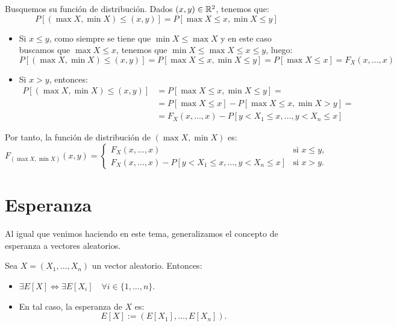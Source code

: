 Busquemos su función de distribución. Dados $(x,y)\in \mathbb{R}^2$, tenemos que:
\begin{equation*}
    P[(\max X, \min X)\leq (x,y)] = P[\max X\leq x, \min X\leq y]
\end{equation*}
\begin{itemize}
    \item Si $x\leq y$, como siempre se tiene que $\min X\leq \max X$ y en este caso buscamos que $\max X\leq x$, tenemos que $\min X\leq \max X\leq x\leq y$, luego:
    \begin{equation*}
        P[(\max X, \min X)\leq (x,y)] = P[\max X\leq x, \min X\leq y] = P[\max X\leq x] = F_X(x,\dots,x)
    \end{equation*}

    \item Si $x>y$, entonces:
    \begin{align*}
        P[(\max X, \min X)\leq (x,y)] &= P[\max X\leq x, \min X\leq y] =\\&= P[\max X\leq x] - P[\max X\leq x,\min X> y] =\\&= F_X(x,\dots,x) - P[y<X_1\leq x,\dots,y<X_n\leq x]
    \end{align*}
\end{itemize}

Por tanto, la función de distribución de $(\max X, \min X)$ es:
\begin{equation*}
    F_{(\max X, \min X)}(x,y) = \begin{cases}
        F_X(x,\dots,x) & \text{si } x\leq y,\\
        F_X(x,\dots,x) - P[y<X_1\leq x,\dots,y<X_n\leq x] & \text{si } x>y.
    \end{cases}
\end{equation*}



\section{Esperanza}

Al igual que venimos haciendo en este tema, generalizamos el concepto de esperanza a vectores aleatorios.
\begin{definicion}[Esperanza]
    Sea $X=(X_1,\dots,X_n)$ un vector aleatorio. Entonces:
    \begin{itemize}
        \item $\exists E[X]\Longleftrightarrow \exists E[X_i] \quad \forall i\in \{1,\dots,n\}$.
        \item En tal caso, la esperanza de $X$ es:
        \begin{equation*}
            E[X] := (E[X_1],\dots,E[X_n]).
        \end{equation*}
    \end{itemize}
\end{definicion}


